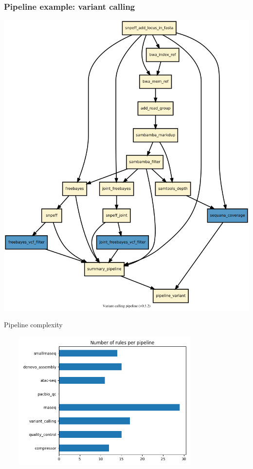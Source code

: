 \documentclass{beamer}
\begin{document}
\begin{frame}
\frametitle{Pipeline example: variant calling} 
\centering
\includegraphics[height=0.8\textheight, 
width=\textwidth]{./images/variant_calling_dag.png}
\end{frame}



\begin{frame}{Pipeline complexity}

    \includegraphics[width=11cm, height=7cm]{images/number_of_rules.png}

\end{frame}
\end{document}
